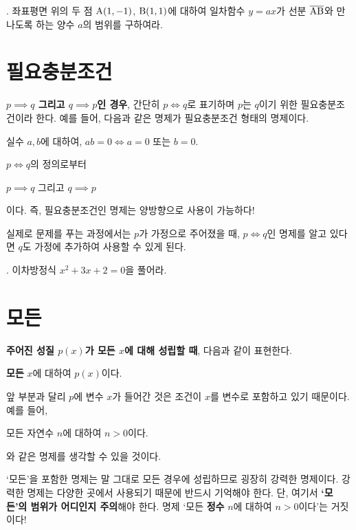 \bigskip

\ex. 좌표평면 위의 두 점 \(\rm{A}(1, -1)\), \(\rm{B}(1, 1)\)에 대하여 일차함수 \(y = ax\)가 선분 \(\overline{\rm{AB}}\)와 만나도록 하는 양수 \(a\)의 범위를 구하여라.

\pagebreak

\section{필요충분조건}

\textbf{\(p \implies q\) 그리고 \(q \implies p\)인 경우}, 간단히 \(p \iff q\)로 표기하며 \(p\)는 \(q\)이기 위한 필요충분조건이라 한다. 예를 들어, 다음과 같은 명제가 필요충분조건 형태의 명제이다.
\begin{center}
    실수 \(a, b\)에 대하여, \(ab = 0 \iff a = 0\) 또는 \(b = 0\).
\end{center}

\(p \iff q\)의 정의로부터
\begin{center}
    \(p \implies q\) 그리고 \(q \implies p\)
\end{center}
이다. 즉, 필요충분조건인 명제는 양방향으로 사용이 가능하다!

실제로 문제를 푸는 과정에서는 \(p\)가 가정으로 주어졌을 때, \(p \iff q\)인 명제를 알고 있다면 \(q\)도 가정에 추가하여 사용할 수 있게 된다.

\bigskip

\ex. 이차방정식 \(x^2 + 3x + 2 = 0\)을 풀어라.

\pagebreak

\section{모든}

\textbf{주어진 성질 \(p(x)\)가 모든 \(x\)에 대해 성립할 때}, 다음과 같이 표현한다.
\begin{center}
    \textbf{모든} \(x\)에 대하여 \(p(x)\)이다.
\end{center}
앞 부분과 달리 \(p\)에 변수 \(x\)가 들어간 것은 조건이 \(x\)를 변수로 포함하고 있기 때문이다. 예를 들어,
\begin{center}
    모든 자연수 \(n\)에 대하여 \(n > 0\)이다.
\end{center}
와 같은 명제를 생각할 수 있을 것이다.

`모든'을 포함한 명제는 말 그대로 모든 경우에 성립하므로 굉장히 강력한 명제이다. 강력한 명제는 다양한 곳에서 사용되기 때문에 반드시 기억해야 한다. 단, 여기서 \textbf{`모든'의 범위가 어디인지 주의}해야 한다. 명제 `모든 \textbf{정수} \(n\)에 대하여 \(n > 0\)이다'는 거짓이다!

